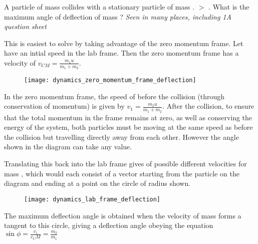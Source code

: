 
\begin{problem}   %
{A particle of mass  collides with a stationary particle of mass .  $>$ . What is the maximum angle of deflection of mass ?} %
{\textit{Seen in many places, including 1A question sheet}} %
{This is easiest to solve by taking advantage of the zero momentum frame. Let  have an intial speed  in the lab frame. Then the zero momentum frame has a velocity of $v_{CM} = \frac{m_{1}u}{m_{1} + m_{2}}$.

\begin{figure}[h]
\centering
\texttt{[image: dynamics\_zero\_momentum\_frame\_deflection]}
\caption{}
\label{fig:dynamics_zero_momentum_frame_deflection}
\end{figure}


In the zero momentum frame, the speed of  before the collision (through conservation of momentum) is given by $v_1 = \frac{m_{2}u}{m_{1} + m_{2}}$. After the collision, to ensure that the total momentum in the frame remains at zero, as well as conserving the energy of the system, both particles must be moving at the same speed as before the collision but travelling directly away from each other. However the angle \vari{\theta} shown in the diagram can take any value.


Translating this back into the lab frame gives of possible different velocities for mass  , which would each consist of a vector starting from the particle on the diagram and ending at a point on the circle of radius  shown.

\begin{figure}[h]
\centering
\texttt{[image: dynamics\_lab\_frame\_deflection]}
\caption{}
\label{fig:dynamics_lab_frame_deflection}
\end{figure}

 The maximum deflection angle is obtained when the velocity of mass  forms a tangent to this circle, giving a deflection angle \vari{\phi} obeying the equation $\sin{\phi} =  \frac{v_1}{v_CM} = \frac{m_2}{m_1}$ }%
\end{problem}

